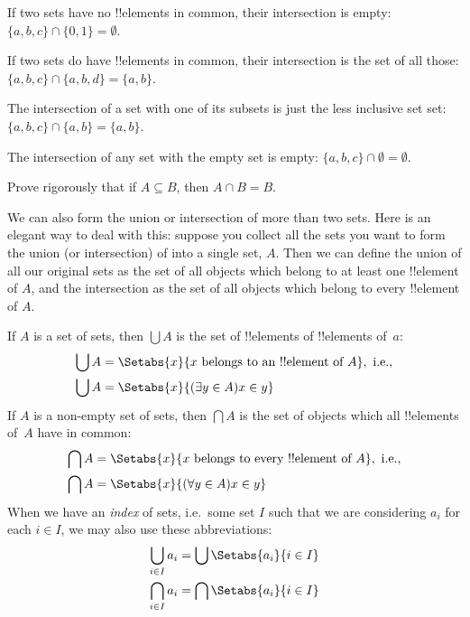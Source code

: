\documentclass[../../../include/open-logic-section]{subfiles}
\begin{document}
\begin{ex}
If two sets have no !!{element}s in common, their intersection is empty:
$\{ a, b, c\} \cap \{ 0, 1\} = \emptyset$.

If two sets do have !!{element}s in common, their intersection is the set of
all those: $\{a, b, c \} \cap \{a, b, d \} = \{a, b\}$.

The intersection of a set with one of its subsets is just the less inclusive set
set: $\{a, b, c\} \cap \{a, b\} = \{a, b\}$.

The intersection of any set with the empty set is empty: $\{a, b, c \}
\cap \emptyset = \emptyset$.
\end{ex}
\begin{prob}
Prove rigorously that if $A \subseteq B$, then $A \cap B = B$.
\end{prob}
\begin{explain}
We can also form the union or intersection of more than two
sets. Here is an elegant way to deal with this: suppose you collect all the sets you want to form the union (or intersection) of into a single set, $A$. Then we can define the union
of all our original sets as the set of all objects which belong to at
least one !!{element} of $A$, and the intersection as the set of all objects which belong to every !!{element} of $A$.
\end{explain}
\begin{defn}
If $A$ is a set of sets, then $\bigcup A$ is the set of !!{element}s of
!!{element}s of~$a$:
\begin{align*}
\bigcup A & = \Setabs{x}{x \text{ belongs to an !!{element} of } A},
\text{ i.e.,}\\
\bigcup A  & = \Setabs{x}{(\exists y \in A)x \in y}
\end{align*}
If $A$ is a non-empty set of sets, then $\bigcap A$ is the set of objects which
all !!{element}s of~$A$ have in common:
\begin{align*}
\bigcap A & = \Setabs{x}{x \text{ belongs to every !!{element} of } A},
\text{ i.e.,}\\
\bigcap A & = \Setabs{x}{(\forall y \in A)x \in y}
\end{align*}
When we have an \emph{index} of sets, i.e.\ some set $I$ such that we are considering $a_i$ for each $i \in I$, we may also use these abbreviations:
\begin{align*}
	\bigcup_{i\in I} a_i & = \bigcup \Setabs{a_i }{i \in I}\\
	\bigcap_{i \in I}a_i & = \bigcap\Setabs{a_i}{i \in I}
\end{align*}
\end{defn}
\end{document}
